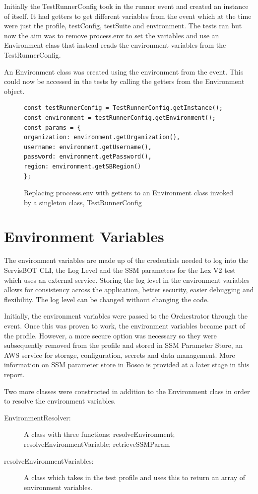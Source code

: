 \documentclass[12pt,a4paper,titlepage]{report}
\begin{document}
Initially the TestRunnerConfig took in the runner event and created an instance of itself. 
It had getters to get different variables from the event which at the time were just the profile, testConfig, testSuite and environment. 
The tests ran but now the aim was to remove process.env to set the variables and use an Environment class that instead reads the environment variables from the TestRunnerConfig.

An Environment class was created using the environment from the event. This could now be accessed in the tests by calling the getters from the Environment object.
\begin{figure}[H]
 \begin{tcolorbox}
  \begin{verbatim}
const testRunnerConfig = TestRunnerConfig.getInstance();
const environment = testRunnerConfig.getEnvironment();
const params = {
organization: environment.getOrganization(),
username: environment.getUsername(),
password: environment.getPassword(),
region: environment.getSBRegion()
};
\end{verbatim}
 \end{tcolorbox}
 \caption{Replacing proccess.env with getters to an Environment class invoked by a singleton class, TestRunnerConfig}
\end{figure}

\section{Environment Variables}
The environment variables are made up of the credentials needed to log into the ServisBOT CLI, the Log Level and the SSM parameters for the Lex V2 test which uses an external service.  
Storing the log level in the environment variables allows for consistency across the application, better security, easier debugging and flexibility. 
The log level can be changed without changing the code.

Initially, the environment variables were passed to the Orchestrator through the event. Once this was proven to work, the environment variables became part of the profile. However, a more 
secure option was necessary so they were subsequently removed from the profile and stored in \ac{SSM} Parameter Store, an AWS service for storage, configuration, secrets and data management. 
More information on SSM parameter store in Bosco is provided at a later stage in this report.

Two more classes were constructed in addition to the Environment class in order to resolve the environment variables. 
\begin{description}
  \item[EnvironmentResolver:]A class with three functions: resolveEnvironment; resolveEnvironmentVariable; retrieveSSMParam
  \item[resolveEnvironmentVariables:]A class which takes in the test profile and uses this to return an array of environment variables.
\end{description}
\end{document}

